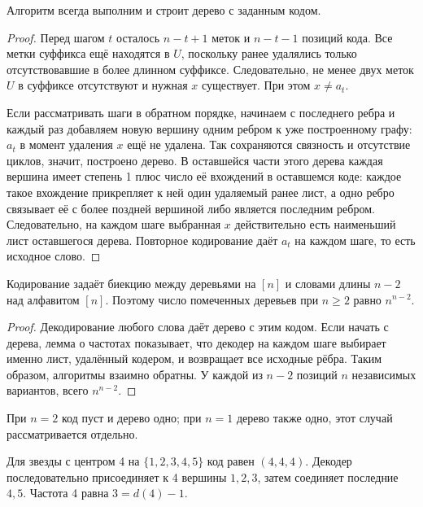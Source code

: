 \begin{lemma}
Алгоритм всегда выполним и строит дерево с заданным кодом.
\end{lemma}
\begin{proof}
Перед шагом \(t\) осталось \(n-t+1\) меток и \(n-t-1\) позиций кода.
Все метки суффикса ещё находятся в \(U\), поскольку ранее удалялись
только отсутствовавшие в более длинном суффиксе. Следовательно,
не менее двух меток \(U\) в суффиксе отсутствуют и нужная \(x\)
существует. При этом \(x\ne a_t\).

Если рассматривать шаги в обратном порядке, начинаем с последнего ребра
и каждый раз добавляем новую вершину одним ребром к уже построенному
графу: \(a_t\) в момент удаления \(x\) ещё не удалена.
Так сохраняются связность и отсутствие циклов, значит, построено дерево.
В оставшейся части этого дерева каждая вершина имеет степень
1 плюс число её вхождений в оставшемся коде: каждое такое вхождение
прикрепляет к ней один удаляемый ранее лист, а одно ребро связывает её
с более поздней вершиной либо является последним ребром.
Следовательно, на каждом шаге выбранная \(x\) действительно есть
наименьший лист оставшегося дерева. Повторное кодирование даёт \(a_t\)
на каждом шаге, то есть исходное слово.
\end{proof}
\begin{theorem}
Кодирование задаёт биекцию между деревьями на \([n]\) и словами
длины \(n-2\) над алфавитом \([n]\). Поэтому число помеченных деревьев
при \(n\ge2\) равно \(n^{n-2}\).
\end{theorem}
\begin{proof}
Декодирование любого слова даёт дерево с этим кодом.
Если начать с дерева, лемма о частотах показывает, что декодер
на каждом шаге выбирает именно лист, удалённый кодером, и возвращает
все исходные рёбра. Таким образом, алгоритмы взаимно обратны.
У каждой из \(n-2\) позиций \(n\) независимых вариантов, всего \(n^{n-2}\).
\end{proof}
При \(n=2\) код пуст и дерево одно; при \(n=1\) дерево также одно,
этот случай рассматривается отдельно.
\begin{example}
Для звезды с центром 4 на \(\{1,2,3,4,5\}\) код равен \((4,4,4)\).
Декодер последовательно присоединяет к 4 вершины \(1,2,3\), затем
соединяет последние \(4,5\). Частота 4 равна \(3=d(4)-1\).
\end{example}
